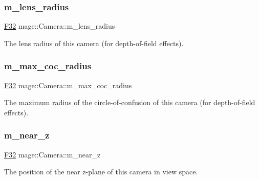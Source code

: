 \subsubsection{\texorpdfstring{m\+\_\+lens\+\_\+radius}{m\_lens\_radius}}
{\footnotesize\ttfamily \hyperlink{namespacemage_aa97e833b45f06d60a0a9c4fc22ae02c0}{F32} mage\+::\+Camera\+::m\+\_\+lens\+\_\+radius\hspace{0.3cm}{\ttfamily [private]}}

The lens radius of this camera (for depth-\/of-\/field effects). \hypertarget{classmage_1_1_camera_af22ec34b0391c1c9a146cdae6e98dd15}{}\label{classmage_1_1_camera_af22ec34b0391c1c9a146cdae6e98dd15} 
\subsubsection{\texorpdfstring{m\+\_\+max\+\_\+coc\+\_\+radius}{m\_max\_coc\_radius}}
{\footnotesize\ttfamily \hyperlink{namespacemage_aa97e833b45f06d60a0a9c4fc22ae02c0}{F32} mage\+::\+Camera\+::m\+\_\+max\+\_\+coc\+\_\+radius\hspace{0.3cm}{\ttfamily [private]}}

The maximum radius of the circle-\/of-\/confusion of this camera (for depth-\/of-\/field effects). \hypertarget{classmage_1_1_camera_a8ae2c8fbe94cb6f8c4cd4a2811900b83}{}\label{classmage_1_1_camera_a8ae2c8fbe94cb6f8c4cd4a2811900b83} 
\subsubsection{\texorpdfstring{m\+\_\+near\+\_\+z}{m\_near\_z}}
{\footnotesize\ttfamily \hyperlink{namespacemage_aa97e833b45f06d60a0a9c4fc22ae02c0}{F32} mage\+::\+Camera\+::m\+\_\+near\+\_\+z\hspace{0.3cm}{\ttfamily [private]}}

The position of the near z-\/plane of this camera in view space. 